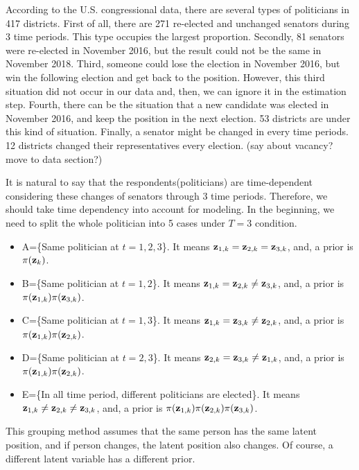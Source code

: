 \documentclass[a4paper, 11pt]{report}
\begin{document}
\quad According to the U.S. congressional data, there are several types of politicians in 417 districts. First of all, there are 271 re-elected and unchanged senators during 3 time periods. This type occupies the largest proportion. Secondly, 81 senators were re-elected in November 2016, but the result could not be the same in November 2018. Third, someone could lose the election in November 2016, but win the following election and get back to the position. However, this third situation did not occur in our data and, then, we can ignore it in the estimation step. Fourth, there can be the situation that a new candidate was elected in November 2016, and keep the position in the next election. 53 districts are under this kind of situation. Finally, a senator might be changed in every time periods. 12 districts changed their representatives every election. (say about vacancy? move to data section?)

\quad It is natural to say that the respondents(politicians) are time-dependent considering these changes of senators through 3 time periods. Therefore, we should take  time dependency into account for modeling. In the beginning, we need to split the whole politician into 5 cases under $T=3$ condition.
\begin{itemize}
    \item A=\{Same politician at $t=1,2,3$\}. It means ${\bf z}_{1,k}={\bf z}_{2,k}={\bf z}_{3,k}$, and, a prior is $\pi({\bf z}_{k})$.
    \item B=\{Same politician at $t=1,2$\}. It means ${\bf z}_{1,k}={\bf z}_{2,k}\neq {\bf z}_{3,k}$, and, a prior is $\pi({\bf z}_{1,k})\pi({\bf z}_{3,k})$.
    \item C=\{Same politician at $t=1,3$\}. It means ${\bf z}_{1,k}={\bf z}_{3,k}\neq{\bf z}_{2,k}$, and, a prior is $\pi({\bf z}_{1,k})\pi({\bf z}_{2,k})$.
    \item D=\{Same politician at $t=2,3$\}. It means ${\bf z}_{2,k}={\bf z}_{3,k}\neq{\bf z}_{1,k}$, and, a prior is $\pi({\bf z}_{1,k})\pi({\bf z}_{2,k})$.
    \item E=\{In all time period, different politicians are elected\}. It means ${\bf z}_{1,k}\neq{\bf z}_{2,k}\neq{\bf z}_{3,k}$, and, a prior is $\pi({\bf z}_{1,k})\pi({\bf z}_{2,k})\pi({\bf z}_{3,k})$.
\end{itemize}

\quad This grouping method assumes that the same person has the same latent position, and if person changes, the latent position also changes. Of course, a different latent variable has a different prior.
\end{document}
